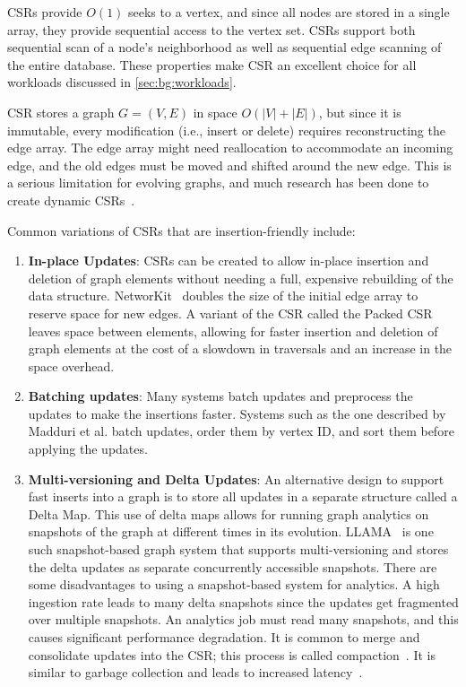 CSRs provide $O(1)$ seeks to a vertex, and since all nodes are stored in a single array, they provide sequential access to the vertex set.
CSRs support both sequential scan of a node's neighborhood as well as sequential edge scanning of the entire database.
These properties make CSR an excellent choice for all workloads discussed in \autoref{sec:bg:workloads}.

CSR stores a graph $G = (V, E)$ in space $O(|V| + |E|)$, but since it is immutable, every modification (i.e., insert or delete) requires reconstructing the edge array.
The edge array might need reallocation to accommodate an incoming edge, and the old edges must be moved and shifted around the new edge.
This is a serious limitation for evolving graphs, and much research has been done to create dynamic CSRs~\cite{staudt2014networkit, PackedCSR, csr++2020Firmli, llama, madduri2009compact}.

Common variations of CSRs that are insertion-friendly include:
\begin{enumerate}
    \item \textbf{In-place Updates}: CSRs can be created to allow in-place insertion and deletion of graph elements without needing a full, expensive rebuilding of the data structure.
    NetworKit~\cite{staudt2014networkit} doubles the size of the initial edge array to reserve space for new edges. 
    A variant of the CSR called the Packed CSR \cite{PackedCSR} leaves space between elements, allowing for faster insertion and deletion of graph elements at the cost of a slowdown in traversals and an increase in the space overhead. 
    \item \textbf{Batching updates}: Many systems batch updates and preprocess the updates to make the insertions faster.
    Systems such as the one described by Madduri et al. \cite{madduri2009compact} batch updates, order them by vertex ID, and sort them before applying the updates.
    \item \textbf{Multi-versioning and Delta Updates}: An alternative design to support fast inserts into a graph is to store all updates in a separate structure called a Delta Map.
    This use of delta maps allows for running graph analytics on snapshots of the graph at different times in its evolution.
    LLAMA~\cite{llama} is one such snapshot-based graph system that supports multi-versioning and stores the delta updates as separate concurrently accessible snapshots. 
    There are some disadvantages to using a snapshot-based system for analytics. 
    A high ingestion rate leads to many delta snapshots since the updates get fragmented over multiple snapshots.
    An analytics job must read many snapshots, and this causes significant performance degradation.
    It is common to merge and consolidate updates into the CSR; this process is called compaction~\cite{csr++2020Firmli,llama}. It is similar to garbage collection and leads to increased 
    latency~\cite[Figure 1]{gao2026grace}.
\end{enumerate}

